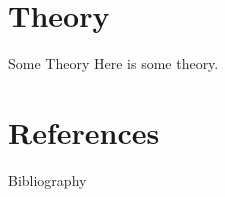 \documentclass[english]{beamer}
\begin{document}
\section{Theory}

\begin{frame}{Some Theory}
Here is some theory.

\end{frame}

\section*{References}

\begin{frame}{Bibliography}
\nocite{*}
\printbibliography
\end{frame}

\end{document}
